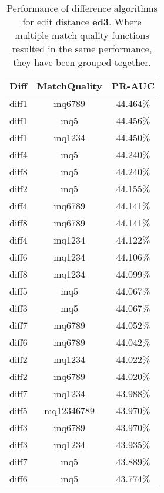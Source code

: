 \begin{table}[tbph]
\begin{center}
\begin{tabular}{|c|c||c|}
\hline
Diff & MatchQuality & PR-AUC  \\
\hline
\hline
diff1 & mq6789 & 44.464\% \\
diff1 & mq5 & 44.456\% \\
diff1 & mq1234 & 44.450\% \\
diff4 & mq5 & 44.240\% \\
diff8 & mq5 & 44.240\% \\
diff2 & mq5 & 44.155\% \\
diff4 & mq6789 & 44.141\% \\
diff8 & mq6789 & 44.141\% \\
diff4 & mq1234 & 44.122\% \\
diff6 & mq1234 & 44.106\% \\
diff8 & mq1234 & 44.099\% \\
diff5 & mq5 & 44.067\% \\
diff3 & mq5 & 44.067\% \\
diff7 & mq6789 & 44.052\% \\
diff6 & mq6789 & 44.042\% \\
diff2 & mq1234 & 44.022\% \\
diff2 & mq6789 & 44.020\% \\
diff7 & mq1234 & 43.988\% \\
diff5 & mq12346789 & 43.970\% \\
diff3 & mq6789 & 43.970\% \\
diff3 & mq1234 & 43.935\% \\
diff7 & mq5 & 43.889\% \\
diff6 & mq5 & 43.774\% \\
\hline
\end{tabular}
\end{center}
\caption{Performance of difference algorithms for
  edit distance \textbf{ed3}.  Where multiple match
  quality functions resulted in the same performance, they
  have been grouped together.}
\label{tab:editlongbyed3}
\end{table}
